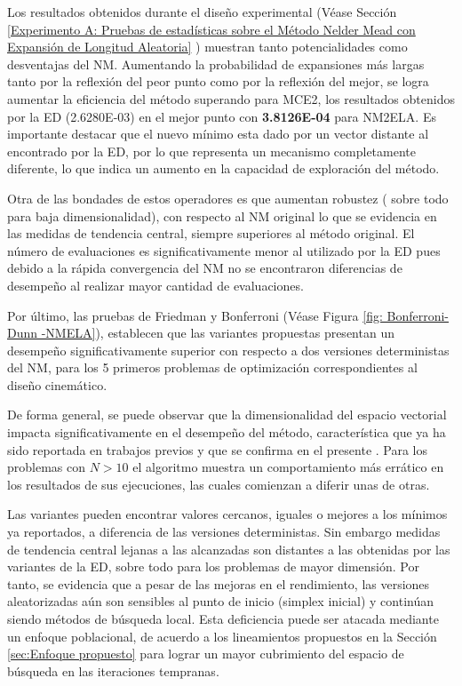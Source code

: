 Los resultados obtenidos durante el diseño experimental (Véase Sección \ref{Experimento A: Pruebas de estadísticas sobre el Método Nelder Mead con Expansión de Longitud Aleatoria} ) muestran tanto potencialidades como desventajas del NM. Aumentando la probabilidad de expansiones más largas tanto por la reflexión del peor punto como por la reflexión del mejor, se logra aumentar la eficiencia del método superando para MCE2, los resultados obtenidos por la ED (2.6280E-03) en el mejor punto con \textbf{3.8126E-04} para NM2ELA. Es importante destacar que el nuevo mínimo esta dado por un vector distante al encontrado por la ED, por lo que representa un mecanismo completamente diferente, lo que indica un aumento en la capacidad de exploración del método. 

Otra de las bondades de estos operadores es que aumentan  robustez ( sobre todo para baja dimensionalidad), con respecto al NM original lo que se evidencia en las medidas de tendencia central, siempre superiores al método original. El número de evaluaciones es significativamente menor al utilizado por la ED pues debido a la rápida convergencia del NM no se encontraron diferencias de desempeño al realizar mayor cantidad de evaluaciones. 

Por último, las pruebas de Friedman y Bonferroni (Véase Figura \ref{fig: Bonferroni-Dunn -NMELA}), establecen que  las variantes propuestas presentan un desempeño significativamente superior con respecto a dos versiones deterministas del NM, para los 5 primeros problemas de optimización correspondientes al diseño cinemático.

De forma general, se puede observar que la dimensionalidad del espacio vectorial impacta significativamente en el desempeño del método, característica que ya ha sido reportada en trabajos previos y que se confirma en el presente \cite{han_effect_2006}. Para los problemas con $N>10$ el algoritmo muestra un comportamiento más errático en los resultados de sus ejecuciones, las cuales comienzan a diferir unas de otras. 

 Las variantes pueden encontrar valores cercanos, iguales o mejores a los mínimos ya reportados, a diferencia  de las versiones deterministas. Sin embargo medidas de tendencia central lejanas a las alcanzadas son distantes a las obtenidas por las variantes de la ED, sobre todo para los problemas de mayor dimensión. Por tanto, se evidencia que a pesar de las mejoras en el rendimiento, las versiones aleatorizadas aún son sensibles al punto de inicio (simplex inicial) y continúan siendo métodos de búsqueda local. Esta deficiencia puede ser atacada mediante un enfoque poblacional, de acuerdo a los lineamientos propuestos en la Sección \ref{sec:Enfoque propuesto} para lograr un mayor cubrimiento del espacio de búsqueda en las iteraciones tempranas.

